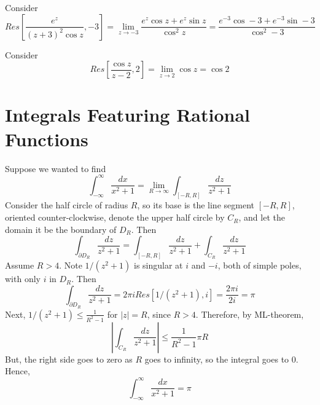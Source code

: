 \begin{example}
    Consider \begin{equation*}
        Res\left[\frac{e^z}{(z+3)^2\cos z},-3\right] = \lim\limits_{z\rightarrow -3}\frac{e^z\cos z+e^z\sin z}{\cos^2z} = \frac{e^{-3}\cos -3 + e^{-3}\sin -3}{\cos^2-3}
    \end{equation*}
\end{example}

\begin{example}
    Consider \begin{equation*}
        Res\left[\frac{\cos z}{z-2},2\right] = \lim\limits_{z\rightarrow 2}\cos z = \cos 2
    \end{equation*}
\end{example}


\section{Integrals Featuring Rational Functions}


\begin{remark}[Problem]
    Suppose we wanted to find $$\int_{-\infty}^{\infty}\frac{dx}{x^2+1} = \lim\limits_{R\rightarrow \infty}\int_{[-R,R]}\frac{dz}{z^2+1}$$ Consider the half circle of radius $R$, so its base is the line segment $[-R,R]$, oriented counter-clockwise, denote the upper half circle by $C_R$, and let the domain it be the boundary of $D_R$. Then \begin{equation*}
        \int_{\partial D_R}\frac{dz}{z^2+1} = \int_{[-R,R]}\frac{dz}{z^2+1}+\int_{C_R}\frac{dz}{z^2+1}
    \end{equation*}
    Assume $R > 4$. Note $1/(z^2+1)$ is singular at $i$ and $-i$, both of simple poles, with only $i$ in $D_R$. Then \begin{equation*}
        \int_{\partial D_R}\frac{dz}{z^2+1} = 2\pi iRes[1/(z^2+1),i] = \frac{2\pi i}{2i} = \pi
    \end{equation*}
    Next, $1/(z^2+1) \leq \frac{1}{R^2-1}$ for $|z| = R$, since $R > 4$. Therefore, by ML-theorem, \begin{equation*}
        \left|\int_{C_R}\frac{dz}{z^2+1}\right| \leq \frac{1}{R^2-1}\pi R
    \end{equation*}
    But, the right side goes to zero as $R$ goes to infinity, so the integral goes to $0$. Hence, \begin{equation*}
        \int_{-\infty}^{\infty}\frac{dx}{x^2+1} = \pi
    \end{equation*}
\end{remark}

